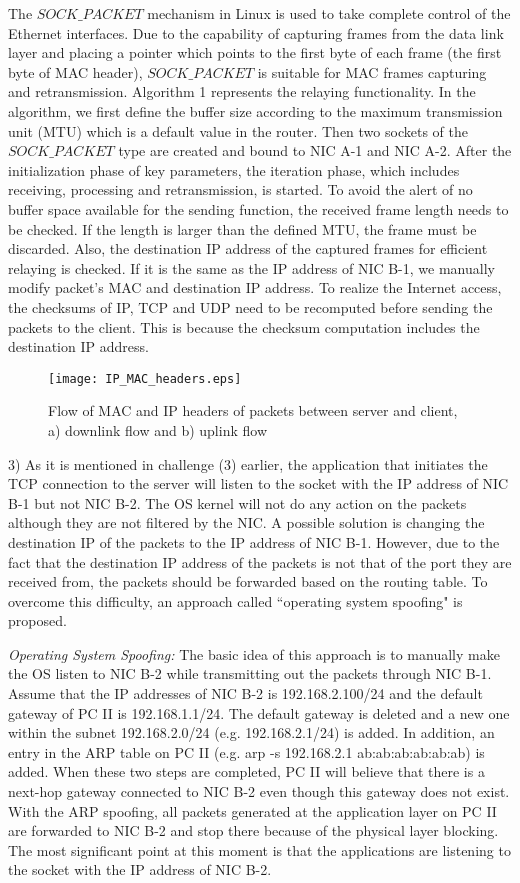\documentclass[10pt,journal]{IEEEtran}
\begin{document}
The $SOCK\_PACKET$ mechanism in Linux is used to take complete control of the Ethernet interfaces. Due to the capability of capturing frames from the data link layer and placing a pointer which points to the first byte of each frame (the first byte of MAC header), $SOCK\_PACKET$ is suitable for MAC frames capturing and retransmission. Algorithm 1 represents the relaying functionality. In the algorithm, we first define the buffer size according to the maximum transmission unit (MTU) which is a default value in the router. Then two sockets of the $SOCK\_PACKET$ type are created and bound to NIC A-1 and NIC A-2. After the initialization phase of key parameters, the iteration phase, which includes receiving, processing and retransmission, is started. To avoid the alert of no buffer space available for the sending function, the received frame length needs to be checked. If the length is larger than the defined MTU, the frame must be discarded. Also, the destination IP address of the captured frames for efficient relaying is checked. If it is the same as the IP address of NIC B-1, we manually modify packet's MAC and destination IP address. To realize the Internet access, the checksums of IP, TCP and UDP need to be recomputed before sending the packets to the client. This is because the checksum computation includes the destination IP address.

\begin{figure}
\centering
\texttt{[image: IP\_MAC\_headers.eps]}
\caption{Flow of MAC and IP headers of packets between server and client, a) downlink flow and b) uplink flow}
\label{fig_IP_MAC_headers}
\end{figure}

3) As it is mentioned in challenge (3) earlier, the application that initiates the TCP connection to the server will listen to the socket with the IP address of NIC B-1 but not NIC B-2. The OS kernel will not do any action on the packets although they are not filtered by the NIC. A possible solution is changing the destination IP of the packets to the IP address of NIC B-1. However, due to the fact that the destination IP address of the packets is not that of the port they are received from, the packets should be forwarded based on the routing table. To overcome this difficulty, an approach called ``operating system spoofing" is proposed.

{\it Operating System Spoofing:} The basic idea of this approach is to manually make the OS listen to NIC B-2 while transmitting out the packets through NIC B-1. Assume that the IP addresses of NIC B-2 is 192.168.2.100/24 and the default gateway of PC II is 192.168.1.1/24. The default gateway is deleted and a new one within the subnet 192.168.2.0/24 (e.g. 192.168.2.1/24) is added. In addition, an entry in the ARP table on PC II (e.g. arp -s 192.168.2.1 ab:ab:ab:ab:ab:ab) is added. When these two steps are completed, PC II will believe that there is a next-hop gateway connected to NIC B-2 even though this gateway does not exist. With the ARP spoofing, all packets generated at the application layer on PC II are forwarded to NIC B-2 and stop there because of the physical layer blocking. The most significant point at this moment is that the applications are listening to the socket with the IP address of NIC B-2.
\end{document}
